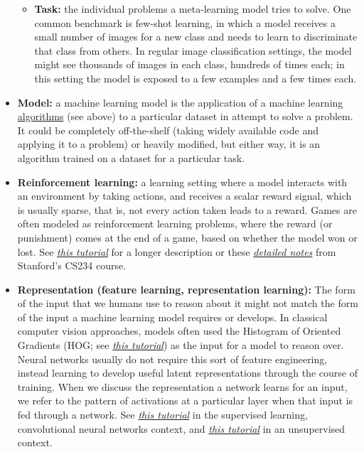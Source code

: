 \begin{itemize}
\begin{itemize}
  \item \textbf{Task:\label{tg:task}} the individual problems a meta-learning model tries to solve. One common benchmark is few-shot learning, in which a model receives a small number of images for a new class and needs to learn to discriminate that class from others. In regular image classification settings, the model might see thousands of images in each class, hundreds of times each; in this setting the model is exposed to a few examples and a few times each.
  \end{itemize}
  
\item \textbf{Model:\label{tg:model}} a machine learning model is the application of a machine learning \hyperref[tg:algorithm]{algorithms} (see above) to a particular dataset in attempt to solve a problem. It could be completely off-the-shelf (taking widely available code and applying it to a problem) or heavily modified, but either way, it is an algorithm trained on a dataset for a particular task.

\item \textbf{Reinforcement learning:\label{tg:reinforcement-learning}} a learning setting where a model interacts with an environment by taking actions, and receives a scalar reward signal, which is usually sparse, that is, not every action taken leads to a reward. Games are often modeled as reinforcement learning problems, where the reward (or punishment) comes at the end of a game, based on whether the model won or lost. See \href{https://skymind.ai/wiki/deep-reinforcement-learning}{\emph{this tutorial}} for a longer description or these \href{http://web.stanford.edu/class/cs234/slides/lnotes_intro.pdf}{\emph{detailed notes}} from Stanford's CS234 course.

\item \textbf{Representation (feature learning, representation learning):\label{tg:representation}} The form of the input that we humans use to reason about it might not match the form of the input a machine learning model requires or develops. In classical computer vision approaches, models often used the Histogram of Oriented Gradients (HOG; see \href{https://www.learnopencv.com/histogram-of-oriented-gradients/}{\emph{this tutorial}}) as the input for a model to reason over. Neural networks usually do not require this sort of feature engineering, instead learning to develop useful latent representations through the course of training. When we discuss the representation a network learns for an input, we refer to the pattern of activations at a particular layer when that input is fed through a network. See \href{http://ufldl.stanford.edu/tutorial/supervised/FeatureExtractionUsingConvolution/}{\emph{this tutorial}} in the supervised learning, convolutional neural networks context, and \href{http://ufldl.stanford.edu/tutorial/selftaughtlearning/SelfTaughtLearning/}{\emph{this tutorial}} in an unsupervised context.


\end{itemize}
